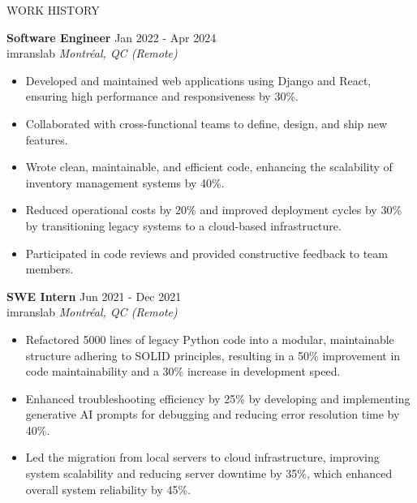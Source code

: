 \documentclass{resume} %
\begin{document}

\begin{rSection}{WORK HISTORY}

\textbf{Software Engineer} \hfill Jan 2022 - Apr 2024\\
imranslab \hfill \textit{Montréal, QC (Remote)}
 \begin{itemize}
    \item Developed and maintained web applications using Django and React, ensuring high performance and responsiveness by 30\%.
    \item Collaborated with cross-functional teams to define, design, and ship new features.
    \item Wrote clean, maintainable, and efficient code, enhancing the scalability of inventory management systems by 40\%.
    \item Reduced operational costs by 20\% and improved deployment cycles by 30\% by transitioning legacy systems to a cloud-based infrastructure.
    \item Participated in code reviews and provided constructive feedback to team members.
 \end{itemize}

\textbf{SWE Intern} \hfill Jun 2021 - Dec 2021\\
imranslab \hfill \textit{Montréal, QC (Remote)}
 \begin{itemize}
    \item Refactored 5000 lines of legacy Python code into a modular, maintainable structure adhering to SOLID principles, resulting in a 50\% improvement in code maintainability and a 30\% increase in development speed.
    \item Enhanced troubleshooting efficiency by 25\% by developing and implementing generative AI prompts for debugging and reducing error resolution time by 40\%.
    \item Led the migration from local servers to cloud infrastructure, improving system scalability and reducing server downtime by 35\%, which enhanced overall system reliability by 45\%.
 \end{itemize}

\end{rSection} 

\end{document}
